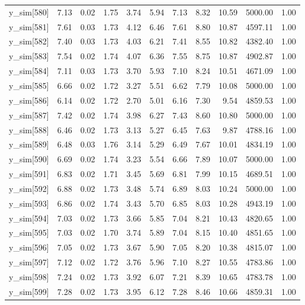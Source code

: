 \begin{table}[ht]
\begin{tabular}{rrrrrrrrrrr}
  y\_sim[580] & 7.13 & 0.02 & 1.75 & 3.74 & 5.94 & 7.13 & 8.32 & 10.59 & 5000.00 & 1.00 \\ 
  y\_sim[581] & 7.61 & 0.03 & 1.73 & 4.12 & 6.46 & 7.61 & 8.80 & 10.87 & 4597.11 & 1.00 \\ 
  y\_sim[582] & 7.40 & 0.03 & 1.73 & 4.03 & 6.21 & 7.41 & 8.55 & 10.82 & 4382.40 & 1.00 \\ 
  y\_sim[583] & 7.54 & 0.02 & 1.74 & 4.07 & 6.36 & 7.55 & 8.75 & 10.87 & 4902.87 & 1.00 \\ 
  y\_sim[584] & 7.11 & 0.03 & 1.73 & 3.70 & 5.93 & 7.10 & 8.24 & 10.51 & 4671.09 & 1.00 \\ 
  y\_sim[585] & 6.66 & 0.02 & 1.72 & 3.27 & 5.51 & 6.62 & 7.79 & 10.08 & 5000.00 & 1.00 \\ 
  y\_sim[586] & 6.14 & 0.02 & 1.72 & 2.70 & 5.01 & 6.16 & 7.30 & 9.54 & 4859.53 & 1.00 \\ 
  y\_sim[587] & 7.42 & 0.02 & 1.74 & 3.98 & 6.27 & 7.43 & 8.60 & 10.80 & 5000.00 & 1.00 \\ 
  y\_sim[588] & 6.46 & 0.02 & 1.73 & 3.13 & 5.27 & 6.45 & 7.63 & 9.87 & 4788.16 & 1.00 \\ 
  y\_sim[589] & 6.48 & 0.03 & 1.76 & 3.14 & 5.29 & 6.49 & 7.67 & 10.01 & 4834.19 & 1.00 \\ 
  y\_sim[590] & 6.69 & 0.02 & 1.74 & 3.23 & 5.54 & 6.66 & 7.89 & 10.07 & 5000.00 & 1.00 \\ 
  y\_sim[591] & 6.83 & 0.02 & 1.71 & 3.45 & 5.69 & 6.81 & 7.99 & 10.15 & 4689.51 & 1.00 \\ 
  y\_sim[592] & 6.88 & 0.02 & 1.73 & 3.48 & 5.74 & 6.89 & 8.03 & 10.24 & 5000.00 & 1.00 \\ 
  y\_sim[593] & 6.86 & 0.02 & 1.74 & 3.43 & 5.70 & 6.85 & 8.03 & 10.28 & 4943.19 & 1.00 \\ 
  y\_sim[594] & 7.03 & 0.02 & 1.73 & 3.66 & 5.85 & 7.04 & 8.21 & 10.43 & 4820.65 & 1.00 \\ 
  y\_sim[595] & 7.03 & 0.02 & 1.70 & 3.74 & 5.89 & 7.04 & 8.15 & 10.40 & 4851.65 & 1.00 \\ 
  y\_sim[596] & 7.05 & 0.02 & 1.73 & 3.67 & 5.90 & 7.05 & 8.20 & 10.38 & 4815.07 & 1.00 \\ 
  y\_sim[597] & 7.12 & 0.02 & 1.72 & 3.76 & 5.96 & 7.10 & 8.27 & 10.55 & 4783.86 & 1.00 \\ 
  y\_sim[598] & 7.24 & 0.02 & 1.73 & 3.92 & 6.07 & 7.21 & 8.39 & 10.65 & 4783.78 & 1.00 \\ 
  y\_sim[599] & 7.28 & 0.02 & 1.73 & 3.95 & 6.12 & 7.28 & 8.46 & 10.66 & 4859.31 & 1.00 \\ 

\end{tabular}
\end{table}
